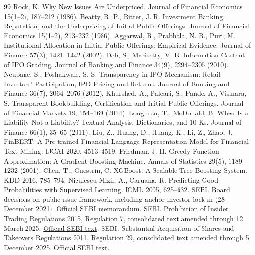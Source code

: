\documentclass[runningheads]{llncs}
\begin{document}
\begin{thebibliography}{99}
 Rock, K. Why New Issues Are Underpriced. Journal of Financial Economics 15(1--2), 187--212 (1986).
 Beatty, R. P., Ritter, J. R. Investment Banking, Reputation, and the Underpricing of Initial Public Offerings. Journal of Financial Economics 15(1--2), 213--232 (1986).
 Aggarwal, R., Prabhala, N. R., Puri, M. Institutional Allocation in Initial Public Offerings: Empirical Evidence. Journal of Finance 57(3), 1421--1442 (2002).
 Deb, S., Marisetty, V. B. Information Content of IPO Grading. Journal of Banking and Finance 34(9), 2294--2305 (2010).
 Neupane, S., Poshakwale, S. S. Transparency in IPO Mechanism: Retail Investors' Participation, IPO Pricing and Returns. Journal of Banking and Finance 36(7), 2064--2076 (2012).
 Khurshed, A., Paleari, S., Pande, A., Vismara, S. Transparent Bookbuilding, Certification and Initial Public Offerings. Journal of Financial Markets 19, 154--169 (2014).
 Loughran, T., McDonald, B. When Is a Liability Not a Liability? Textual Analysis, Dictionaries, and 10-Ks. Journal of Finance 66(1), 35--65 (2011).
 Liu, Z., Huang, D., Huang, K., Li, Z., Zhao, J. FinBERT: A Pre-trained Financial Language Representation Model for Financial Text Mining. IJCAI 2020, 4513--4519.
 Friedman, J. H. Greedy Function Approximation: A Gradient Boosting Machine. Annals of Statistics 29(5), 1189--1232 (2001).
 Chen, T., Guestrin, C. XGBoost: A Scalable Tree Boosting System. KDD 2016, 785--794.
 Niculescu-Mizil, A., Caruana, R. Predicting Good Probabilities with Supervised Learning. ICML 2005, 625--632.
 SEBI. Board decisions on public-issue framework, including anchor-investor lock-in (28 December 2021). \href{https://www.sebi.gov.in/sebi_data/attachdocs/dec-2021/1640688619467.pdf}{Official SEBI memorandum}.
 SEBI. Prohibition of Insider Trading Regulations 2015, Regulation 7, consolidated text amended through 12 March 2025. \href{https://www.sebi.gov.in/legal/regulations/mar-2025/securities-and-exchange-board-of-india-prohibition-of-insider-trading-regulations-2015-last-amended-on-march-12-2025-_92672.html}{Official SEBI text}.
 SEBI. Substantial Acquisition of Shares and Takeovers Regulations 2011, Regulation 29, consolidated text amended through 5 December 2025. \href{https://www.sebi.gov.in/legal/regulations/dec-2025/securities-and-exchange-board-of-india-substantial-acquisition-of-shares-and-takeovers-regulations-2011-last-amended-on-december-5-2025-_98643.html}{Official SEBI text}.
\end{thebibliography}
\end{document}
